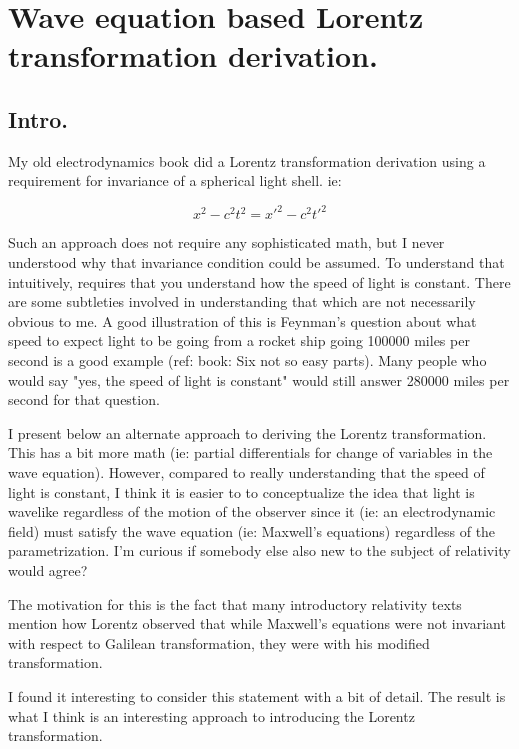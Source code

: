 \chapter{Wave equation based Lorentz transformation derivation.}
\date{ June 25, 2008 }        %

\section{Intro.}

My old electrodynamics book did a Lorentz transformation derivation using a requirement for invariance of a spherical light shell.  ie:

\[
x^2 - c^2 t^2 = {x'}^2 - c^2 {t'}^2
\]

Such an approach does not require any sophisticated math, but I never understood why that invariance condition could be assumed.
To understand that intuitively, requires that you understand how the speed of light is constant.  There are some subtleties 
involved in understanding that which are not necessarily obvious to me.  A good illustration of this is Feynman's question
about what speed to expect light to be
going from a rocket ship going 100000 miles per second is a good example (ref: book: Six not so easy parts).
Many people who would say "yes, the speed of light is constant" would still answer 280000 miles per second for that question.

I present below an alternate approach to deriving the Lorentz transformation.  This has a bit more math (ie: partial differentials for 
change of variables in the wave equation).  However, compared to really understanding that the speed of light is constant,
I think it is easier to
to conceptualize the idea that light is wavelike regardless of the motion of the observer since it (ie: an electrodynamic field)
must satisfy the wave equation (ie: Maxwell's equations) regardless of the parametrization.  I'm curious if somebody
else also new to the subject of relativity would agree?

The motivation for this is the fact that many introductory relativity texts mention how Lorentz observed that
while Maxwell's equations were not invariant with respect to Galilean
transformation, they were with his modified transformation.

I found it interesting to consider this statement with a bit of detail.  The result is what I think is an interesting approach
to introducing the Lorentz transformation.

